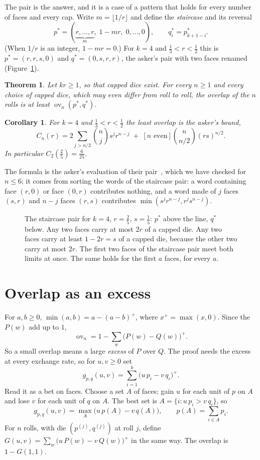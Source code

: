\documentclass[11pt]{article}
\newtheorem{theorem}{Theorem}
\newtheorem{corollary}{Corollary}
\theoremstyle{remark}
\newcommand{\ov}{\operatorname{ov}}
\begin{document}
The pair is the answer, and it is a case of a pattern that holds for every number of faces and every cap.
Write $m=\lfloor1/r\rfloor$ and define the \emph{staircase} and its reversal
\[
p^*=(\underbrace{r,\dots,r}_{m},\;1-mr,\;0,\dots,0),\qquad q^*_i=p^*_{k+1-i}.
\]
(When $1/r$ is an integer, $1-mr=0$.) For $k=4$ and $\frac13<r<\frac12$ this is $p^*=(r,r,s,0)$ and
$q^*=(0,s,r,r)$, the asker's pair with two faces renamed (Figure~\ref{fig:stair}).

\begin{theorem}\label{thm:main}
Let $kr\ge1$, so that capped dice exist. For every $n\ge1$ and every choice of capped dice, which may even
differ from roll to roll, the overlap of the $n$ rolls is at least $\ov_n(p^*,q^*)$.
\end{theorem}

\begin{corollary}\label{cor:asker}
For $k=4$ and $\frac13<r<\frac12$ the least overlap is the asker's bound,
\[
C_n(r)=2\sum_{j>n/2}\binom nj s^jr^{n-j}\;+\;[n\text{ even}]\binom n{n/2}(rs)^{n/2}.
\]
In particular $C_2(\frac25)=\frac6{25}$.
\end{corollary}

The formula is the asker's evaluation of their pair~\cite{MSE}, which we have checked for $n\le6$; it comes from
sorting the words of the staircase pair: a word containing face
$(r,0)$ or face $(0,r)$ contributes nothing, and a word made of $j$ faces $(s,r)$ and $n-j$ faces $(r,s)$
contributes $\min(s^jr^{n-j},r^js^{n-j})$.

\begin{figure}[ht]
\centering

\caption{The staircase pair for $k=4$, $r=\frac25$, $s=\frac15$: $p^*$ above the line, $q^*$ below. Any two
faces carry at most $2r$ of a capped die. Any two faces carry at least $1-2r=s$ of a capped die, because the
other two carry at most $2r$. The first two faces of the staircase pair meet both limits at once. The same
holds for the first $a$ faces, for every $a$.}
\label{fig:stair}
\end{figure}

\section{Overlap as an excess}

For $a,b\ge0$, $\min(a,b)=a-(a-b)^+$, where $x^+=\max(x,0)$. Since the $P(w)$ add up to $1$,
\[
\ov_n=1-\sum_w\bigl(P(w)-Q(w)\bigr)^+ .
\]
So a small overlap means a large \emph{excess} of $P$ over $Q$. The proof needs the excess at every
exchange rate, so for $u,v\ge0$ set
\[
g_{p,q}(u,v)=\sum_{i=1}^k\bigl(u\,p_i-v\,q_i\bigr)^+ .
\]
Read it as a bet on faces. Choose a set $A$ of faces; gain $u$ for each unit of $p$ on $A$ and lose $v$ for each
unit of $q$ on $A$. The best set is $A=\{i:u\,p_i>v\,q_i\}$, so
\begin{equation}\label{eq:bet}
g_{p,q}(u,v)=\max_{A}\bigl(u\,p(A)-v\,q(A)\bigr),\qquad p(A)=\sum_{i\in A}p_i .
\end{equation}
For $n$ rolls, with die $(p^{(j)},q^{(j)})$ at roll $j$, define $G(u,v)=\sum_w\bigl(u\,P(w)-v\,Q(w)\bigr)^+$ in
the same way. The overlap is $1-G(1,1)$.
\end{document}
